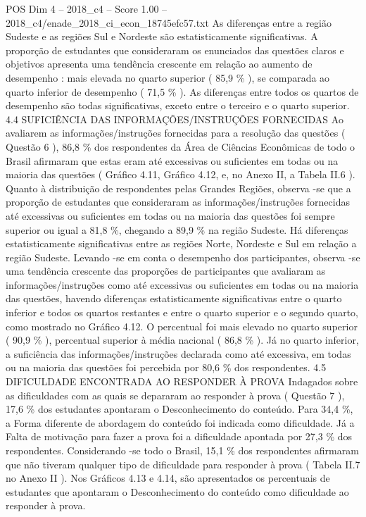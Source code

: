 \begin{textsample}{POS Dim 4 – 2018\_c4 – Score 1.00 – 2018\_c4/enade\_2018\_ci\_econ\_18745efc57.txt}
As diferenças entre a região Sudeste e as regiões Sul e Nordeste são estatisticamente significativas.
A proporção de estudantes que consideraram os enunciados das questões claros e objetivos apresenta uma tendência crescente em relação ao aumento de desempenho : mais elevada no quarto superior ( 85,9 \% ), se comparada ao quarto inferior de desempenho ( 71,5 \% ).
As diferenças entre todos os quartos de desempenho são todas significativas, exceto entre o terceiro e o quarto superior. 4.4 SUFICIÊNCIA DAS INFORMAÇÕES/INSTRUÇÕES FORNECIDAS Ao avaliarem as informações/instruções fornecidas para a resolução das questões ( Questão 6 ), 86,8 \% dos respondentes da Área de Ciências Econômicas de todo o Brasil afirmaram que estas eram até excessivas ou suficientes em todas ou na maioria das questões ( Gráfico 4.11, Gráfico 4.12, e, no Anexo II, a Tabela II.6 ).
Quanto à distribuição de respondentes pelas Grandes Regiões, observa -se que a proporção de estudantes que consideraram as informações/instruções fornecidas até excessivas ou suficientes em todas ou na maioria das questões foi sempre superior ou igual a 81,8 \%, chegando a 89,9 \% na região Sudeste.
Há diferenças estatisticamente significativas entre as regiões Norte, Nordeste e Sul em relação a região Sudeste.
Levando -se em conta o desempenho dos participantes, observa -se uma tendência crescente das proporções de participantes que avaliaram as informações/instruções como até excessivas ou suficientes em todas ou na maioria das questões, havendo diferenças estatisticamente significativas entre o quarto inferior e todos os quartos restantes e entre o quarto superior e o segundo quarto, como mostrado no Gráfico 4.12.
O percentual foi mais elevado no quarto superior ( 90,9 \% ), percentual superior à média nacional ( 86,8 \% ).
Já no quarto inferior, a suficiência das informações/instruções declarada como até excessiva, em todas ou na maioria das questões foi percebida por 80,6 \% dos respondentes. 4.5 DIFICULDADE ENCONTRADA AO RESPONDER À PROVA Indagados sobre as dificuldades com as quais se depararam ao responder à prova ( Questão 7 ), 17,6 \% dos estudantes apontaram o Desconhecimento do conteúdo.
Para 34,4 \%, a Forma diferente de abordagem do conteúdo foi indicada como dificuldade.
Já a Falta de motivação para fazer a prova foi a dificuldade apontada por 27,3 \% dos respondentes.
Considerando -se todo o Brasil, 15,1 \% dos respondentes afirmaram que não tiveram qualquer tipo de dificuldade para responder à prova ( Tabela II.7 no Anexo II ).
Nos Gráficos 4.13 e 4.14, são apresentados os percentuais de estudantes que apontaram o Desconhecimento do conteúdo como dificuldade ao responder à prova.

\end{textsample}
